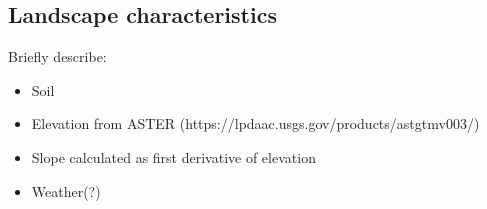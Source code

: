 \subsection{Landscape characteristics}

Briefly describe: 

\begin{itemize}
    \item Soil
    \item Elevation from ASTER (https://lpdaac.usgs.gov/products/astgtmv003/)
    \item Slope calculated as first derivative of elevation 
    \item Weather(?)
\end{itemize}

